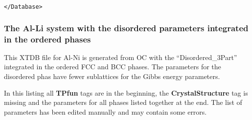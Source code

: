 \documentclass{article}
\begin{document}
\begin{appendices}
\begin{verbatim}
</Database>
\end{verbatim}

\subsubsection{The Al-Li system with the disordered parameters
  integrated in the ordered phases}\label{sec:alli2}

This XTDB file for Al-Ni is generated from OC with the
``Disordered\_3Part'' integrated in the ordered FCC and BCC phases.
The parameters for the disordered phas have fewer sublattices for the
Gibbs energy parameters.

In this listing all {\bf TPfun} tags are in the beginning, the {\bf
  CrystalStructure} tag is missing and the parameters for all phases
listed together at the end.  The list of parameters has been edited
manually and may contain some errors.


\end{appendices}
\end{document}

